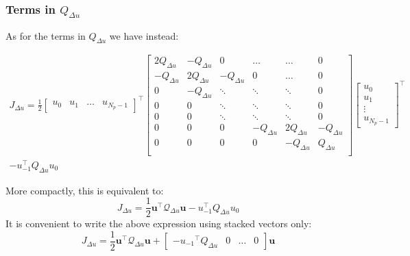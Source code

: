 \documentclass[a4paper,12pt,fleqn]{article}
\newcommand{\varuvec}{\mathbf{u}}
\newcommand{\Np}{{N_p}}
\newcommand{\baru}{u_{-1}}
\begin{document}
  \subsubsection{Terms in $Q_{\Delta u}$}
 As for the terms in $Q_{\Delta u}$ we have instead:
 \begin{small}
\begin{multline}
 J_{\Delta u} = \frac{1}{2}
 \begin{bmatrix}
  u_0 & u_1 &\dots & u_{\Np-1}
 \end{bmatrix}^\top
  \begin{bmatrix}
  2Q_{\Delta u} & -Q_{\Delta u} &0                  & \dots         & \dots  &   0\\
  -Q_{\Delta u} & 2Q_{\Delta u} &-Q_{\Delta u}      &0              & \dots  &   0\\
  0             & -Q_{\Delta u} &\ddots             & \ddots        &\ddots  &   0\\
  0             & 0             &\ddots             & \ddots        &\ddots  &   0\\  
  0             & 0             &\ddots             & \ddots        &\ddots  &   0\\
  0             & 0             &0                  &-Q_{\Delta u}  & 2Q_{\Delta u} &-Q_{\Delta u}\\  
  0             & 0             &0                  &0              & -Q_{\Delta u} &Q_{\Delta u}\\  
  \end{bmatrix}
 \begin{bmatrix}
  u_0 \\  u_1\\ \vdots\\  u_{\Np-1}
 \end{bmatrix}^\top \\
-\baru^\top Q_{\Delta u}u_0
 \end{multline} 
 \end{small}
 More compactly, this is equivalent to:
\begin{equation*}
 J_{\Delta u} = \frac{1}{2} \varuvec^\top \mathcal{Q}_{\Delta u} \varuvec -\baru^\top Q_{\Delta u}u_0
\end{equation*}
 It is convenient to write the above expression using stacked vectors only:
\begin{equation}
 J_{\Delta u} = \frac{1}{2} \varuvec^\top \mathcal{Q}_{\Delta u} \varuvec +   
 \begin{bmatrix}
  -{\baru}^\top Q_{\Delta u} & 0 & \dots  & 0
 \end{bmatrix} \varuvec
\end{equation}
 
\end{document}
